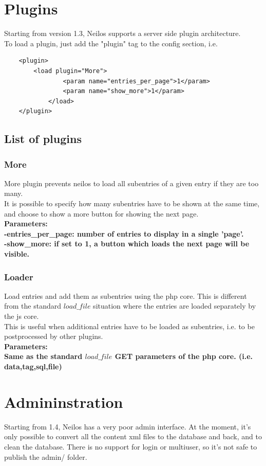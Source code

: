 \documentclass[a4paper,12pt]{article}
\begin{document}
\section{Plugins}
Starting from version 1.3, Neilos supports a server side plugin architecture.\\
To load a plugin, just add the "plugin" tag to the config section, i.e.
\begin{verbatim}
    <plugin>
	    <load plugin="More">
                <param name="entries_per_page">1</param>
                <param name="show_more">1</param>
            </load>
    </plugin>
        \end{verbatim}
\subsection{List of plugins}
\subsubsection{More}
More plugin prevents neilos to load all subentries of a given entry if they are too many.\\
It is possible to specify how many subentries have to be shown at the same time, and choose to show a more button for showing the next page.\\
\bfseries Parameters:\\
\normalfont \normalsize -entries\_per\_page: number of entries to display in a single 'page'.\\
-show\_more: if set to 1, a button which loads the next page will be visible.\\
\subsubsection{Loader}
Load entries and add them as subentries using the php core. This is different from the standard $load\_file$ situation where the entries are loaded separately by the js core.\\
This is useful when additional entries have to be loaded as subentries, i.e. to be postprocessed by other plugins.\\
\bfseries Parameters:\\
\normalfont \normalsize Same as the standard $load\_file$ GET parameters of the php core. (i.e. data,tag,sql,file)
\section{Admininstration}
Starting from 1.4, Neilos has a very poor admin interface. At the moment, it's only possible to convert all the content xml files to the database and back, and to clean the database. There is no support for login or multiuser, so it's not safe to publish the admin/ folder.
\end{document}
